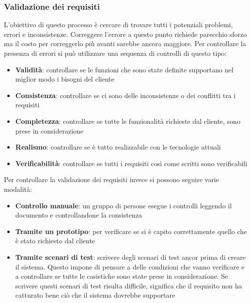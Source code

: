\subsubsection{Validazione dei requisiti}
L'obiettivo di questo processo è cercare di trovare tutti i potenziali problemi, errori e inconsistenze.
Correggere l'errore a questo punto richiede parecchio sforzo ma il costo per correggerlo più avanti sarebbe ancora maggiore.
Per controllare la presenza di errori si può utilizzare una sequenza di controlli di questo tipo:
\begin{itemize}[noitemsep]
    \item \textbf{Validità}: controllare se le funzioni che sono state definite supportano nel miglior modo i bisogni del cliente
    \item \textbf{Consistenza}: controllare se ci sono delle inconsistenze o dei conflitti tra i requisiti
    \item \textbf{Completezza}: controllare se tutte le funzionalità richieste dal cliente, sono prese in considerazione
    \item \textbf{Realismo}: controllare se è tutto realizzabile con le tecnologie attuali
    \item \textbf{Verificabilità}: controllare se tutti i requisiti così come scritti sono verificabili
\end{itemize}
Per controllare la validazione dei requisiti invece si possono seguire varie modalità:
\begin{itemize}[noitemsep]
    \item \textbf{Controllo manuale}: un gruppo di persone esegue i controlli leggendo il documento e controllandone la consistenza
    \item \textbf{Tramite un prototipo}: per verificare se si è capito correttamente quello che è stato richiesto dal cliente
    \item \textbf{Tramite scenari di test}: scrivere degli scenari di test ancor prima di creare il sistema. Questo impone di pensare a delle condizioni che vanno verificare e a controllare se tutte le casistiche sono state prese in considerazione. Se scrivere questi scenari di test risulta difficile, significa che il requisito non ha catturato bene ciò che il sistema dovrebbe supportare
\end{itemize}

